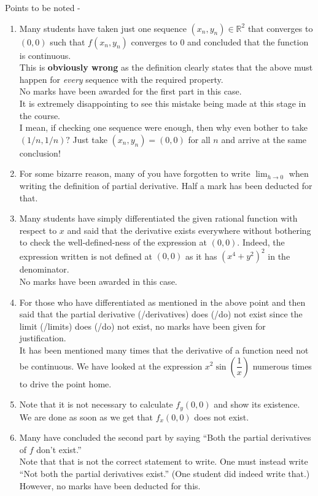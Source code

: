 \documentclass{article}
\begin{document}
\vspace{0.2 cm}

Points to be noted -
\begin{enumerate} 
	\item Many students have taken just one sequence $(x_n, y_n) \in \mathbb{R}^2$ that converges to $(0,0)$ such that $f(x_n, y_n)$ converges to $0$ and concluded that the function is continuous.\\
	This is \textbf{obviously wrong} as the definition clearly states that the above must happen for \emph{every} sequence with the required property. \\
	No marks have been awarded for the first part in this case. \\
	It is extremely disappointing to see this mistake being made at this stage in the course. \\
	I mean, if checking one sequence were enough, then why even bother to take $(1/n, 1/n)?$ Just take $(x_n, y_n) = (0, 0)$ for all $n$ and arrive at the same conclusion!
	\item For some bizarre reason, many of you have forgotten to write $\displaystyle\lim_{h\to 0}$ when writing the definition of partial derivative. Half a mark has been deducted for that.
	\item Many students have simply differentiated the given rational function with respect to $x$ and said that the derivative exists everywhere without bothering to check the well-defined-ness of the expression at $(0,0).$ Indeed, the expression written is not defined at $(0,0)$ as it has $(x^4 + y^2)^2$ in the denominator.\\
	No marks have been awarded in this case.
	\item For those who have differentiated as mentioned in the above point and then said that the partial derivative (/derivatives) does (/do) not exist since the limit (/limits) does (/do) not exist, no marks have been given for justification.\\
	It has been mentioned many times that the derivative of a function need not be continuous. We have looked at the expression $x^2\sin\left(\dfrac{1}{x}\right)$ numerous times to drive the point home.
	\item Note that it is not necessary to calculate $f_y(0,0)$ and show its existence. We are done as soon as we get that $f_x(0,0)$ does not exist.
	\item Many have concluded the second part by saying ``Both the partial derivatives of $f$ don't exist.''\\
	Note that that is not the correct statement to write. One must instead write ``Not both the partial derivatives exist.'' (One student did indeed write that.)\\
	However, no marks have been deducted for this.
\end{enumerate}
\end{document}
